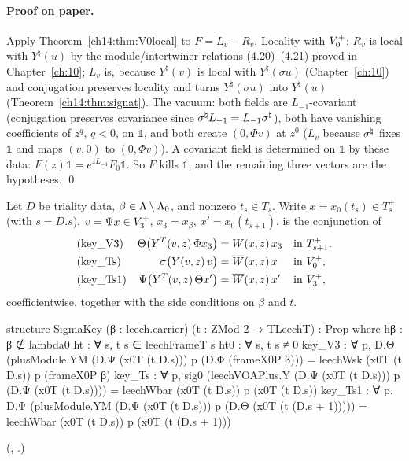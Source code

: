 \paragraph{Proof on paper.}  Apply Theorem~\ref{ch14:thm:V0local} to $F=L_v-R_v$.  Locality with
$V_0^{+}$: $R_v$ is local with $Y^\natural(u)$ by the module/intertwiner relations (4.20)--(4.21)
proved in Chapter~\ref{ch:10}; $L_v$ is, because $Y^\natural(v)$ is local with $Y^\natural(\sigma u)$
(Chapter~\ref{ch:10}) and conjugation preserves locality and turns $Y^\natural(\sigma u)$ into
$Y^\natural(u)$ (Theorem~\ref{ch14:thm:signat}).  The vacuum: both fields are $L_{-1}$-covariant
(conjugation preserves covariance since $\sigma^{\natural} L_{-1}=L_{-1}\sigma^{\natural}$), both have vanishing
coefficients of $z^{q}$, $q<0$, on $\mathbb 1$, and both create $(0,\Phi v)$ at $z^0$ ($L_v$ because $\sigma^{\natural}$ fixes $\mathbb 1$ and maps $(v,0)$ to $(0,\Phi v)$).
A covariant field is determined on $\mathbb 1$ by these data: $F(z)\mathbb 1=e^{zL_{-1}}F_0\mathbb 1$.
So $F$ kills $\mathbb 1$, and the remaining three vectors are the hypotheses. \qed

\begin{definition}\label{ch14:def:sigmakey}
Let $D$ be triality data, $\beta\in{\Lambda}\setminus{\Lambda}_0$, and nonzero $t_s\in T_s$.  Write
$x=x_0(t_s)\in T_s^+$ (with $s=D.s$), $v=\Psi x\in V_3^{+}$, $x_3=x_\beta$, $x'=x_0(t_{s+1})$.
 is the conjunction of
\begin{align*}
 &\text{(key\_V3)} & \Theta\bigl(Y^T(v,z)\,\Phi x_3\bigr)&=W(x,z)\,x_3 &&\text{in }T_{s+1}^+,\\
 &\text{(key\_Ts)} & \sigma\bigl(Y(v,z)\,v\bigr)&=\overline W(x,z)\,x &&\text{in }V_0^{+},\\
 &\text{(key\_Ts1)} & \Psi\bigl(Y^T(v,z)\,\Theta x'\bigr)&=\overline W(x,z)\,x' &&\text{in }V_3^{+},
\end{align*}
coefficientwise, together with the side conditions on $\beta$ and $t$.
\end{definition}
\begin{leancode}
structure SigmaKey (β : leech.carrier) (t : ZMod 2 → TLeechT) : Prop where
  hβ : β ∉ lambda0
  ht : ∀ s, t s ∈ leechFrameT s
  ht0 : ∀ s, t s ≠ 0
  key_V3 : ∀ p, D.Θ (plusModule.YM (D.Ψ (x0T (t D.s))) p (D.Φ (frameX0P β)))
    = leechWsk (x0T (t D.s)) p (frameX0P β)
  key_Ts : ∀ p, sig0 (leechVOAPlus.Y (D.Ψ (x0T (t D.s))) p (D.Ψ (x0T (t D.s))))
    = leechWbar (x0T (t D.s)) p (x0T (t D.s))
  key_Ts1 : ∀ p, D.Ψ (plusModule.YM (D.Ψ (x0T (t D.s))) p (D.Θ (x0T (t (D.s + 1)))))
    = leechWbar (x0T (t D.s)) p (x0T (t (D.s + 1)))
\end{leancode}
(, .)

